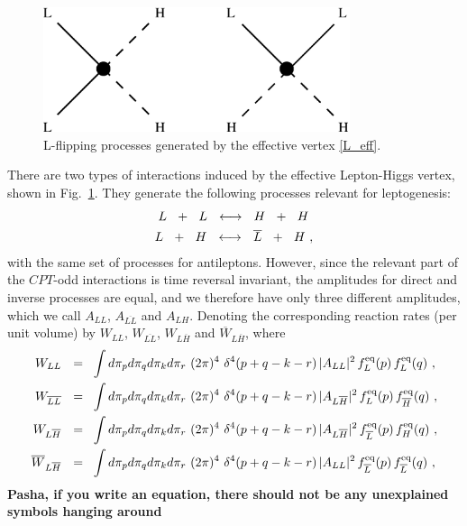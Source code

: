 \documentclass[12pt]{revtex4}
\newcommand{\eq}{{\rm eq}}
\newcommand{\ov}{\overline}
\begin{document}
\begin{figure}
\includegraphics[width=9cm]{lflip.eps}
\caption{L-flipping processes generated by the effective vertex \eqref{L_eff}.}
\label{lflip_fig}
\end{figure}
There are two types of interactions induced by the effective
Lepton-Higgs vertex, 
shown in  Fig.~\ref{lflip_fig}.
They generate the following processes relevant for leptogenesis:
\begin{align}
\notag
	L~~+~~L ~~\longleftrightarrow~~ H~~+~~H~  \\
\notag
	L~~+~~H ~~\longleftrightarrow~~ \ov{L}~~+~~H~,
\end{align}
with the same set of processes
for antileptons.
However, since the relevant part of the $CPT$-odd interactions is time reversal invariant, 
the amplitudes for
direct and inverse processes are equal, and we therefore have 
only three different amplitudes, which we call  
$ A_{LL} $, $ A_{\ov{LL}} $ and $ A_{LH} $.
Denoting the corresponding reaction rates (per unit volume) by
$ W_{LL} $, $ W_{\ov{LL}} $, $ W_{L\ov{H}} $ and $ \ov{W}_{L\ov{H}} $,
where 
\begin{align*}
	W_{LL}   ~~=~~  &
		\int d\pi_p d\pi_q d\pi_k d\pi_r ~
		(2\pi)^4~ \delta^4 ( p + q - k - r )\,
		| A_{LL} |^2\, f_L^\eq(p)\, f_L^\eq(q)~, \\
	W_{\ov{LL}}   ~~=~~  &
		\int d\pi_p d\pi_q d\pi_k d\pi_r ~
		(2\pi)^4~ \delta^4 ( p + q - k - r )\,
		| A_{L\ov{H}} |^2\, f_L^\eq(p)\, f_{\ov{H}}^\eq(q)~, \\
	W_{L\ov{H}}  ~~=~~  &
		\int d\pi_p d\pi_q d\pi_k d\pi_r ~
		(2\pi)^4~ \delta^4 ( p + q - k - r )\,
		| A_{L\ov{H}} |^2\, f_{\ov{L}}^\eq(p)\, f_H^\eq(q)~, \\
	\ov{W}_{L\ov{H}}  ~~=~~  &
		\int d\pi_p d\pi_q d\pi_k d\pi_r ~
		(2\pi)^4~ \delta^4 ( p + q - k - r )\,
		| A_{LL} |^2\, f_{\ov{L}}^\eq(p)\, f_{\ov{L}}^\eq(q)~,
\end{align*}
	{\bf Pasha, if you write an equation, there should not be 
any unexplained symbols hanging around}
\end{document}
